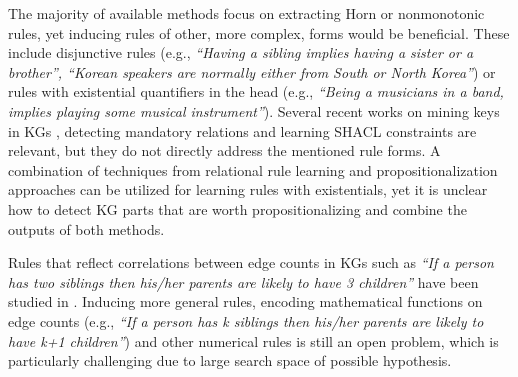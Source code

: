 The majority of available methods focus on extracting Horn or nonmonotonic rules, yet inducing rules of other, more complex, forms would be beneficial. These include %
disjunctive rules
(e.g., \emph{``Having a sibling implies having a sister or a brother'', ``Korean speakers are normally either from South or North Korea''})
 or rules with existential quantifiers in the head (e.g., \emph{``Being a musicians in a band, implies  playing some musical instrument''}).
Several recent works on mining keys in KGs \cite{vickey,DBLP:conf/www/LajusS18}, detecting mandatory relations \cite{DBLP:conf/www/LajusS18} and learning SHACL constraints \cite{shacl} are relevant, but they do not directly address the mentioned rule forms. A combination of techniques from relational rule learning \cite{DBLP:books/daglib/0021868} and propositionalization approaches \cite{propos} can be utilized for learning rules with existentials, yet it is unclear how to detect KG parts that are worth propositionalizing and combine the outputs of both methods.  %

Rules that reflect correlations between edge counts in KGs such as \emph{``If a person has two siblings then his/her parents are likely to have 3 children''} have been studied in \cite{carl}. Inducing more general rules, encoding mathematical functions on edge counts (e.g.,  \emph{``If a person has k siblings then his/her parents are likely to have k+1 children''}) and other numerical rules is still an open problem, which is particularly challenging due to large search space of possible hypothesis.


